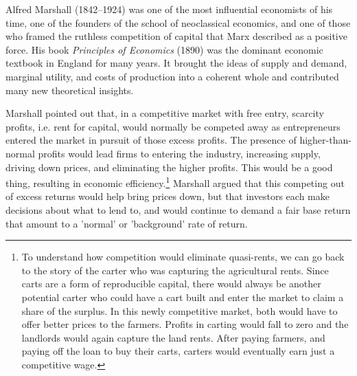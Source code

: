 Alfred Marshall (1842--1924) was one of the most influential economists of his time,  one of the founders of the school of neoclassical economics, and one of those who framed the ruthless competition of capital that Marx described as a positive force. His book \textit{Principles of Economics} (1890) \cite{marshallPrinciplesEconomics1890} was the dominant economic textbook in England for many years. It brought the ideas of supply and demand, marginal utility, and costs of production into a coherent whole and contributed many new theoretical insights.

Marshall pointed out that, in a competitive market with \gls{free entry}, {scarcity profits}, i.e. rent for capital, would normally be competed away as entrepreneurs entered the market in pursuit of those \gls{excess profits}. The presence of higher-than-normal profits would lead firms  to entering the industry, increasing supply, driving down prices, and eliminating the higher profits.  This would be a good thing, resulting in economic efficiency.\footnote{To understand how competition would eliminate quasi-rents, we can go back to the story of the carter who was capturing the agricultural rents. Since carts are a form of reproducible capital, there would always be another potential carter who could have a cart built and enter the market to claim a share of the surplus. In this newly competitive market, both would have to offer better prices to the farmers. Profits in carting would fall to zero and the landlords would again capture the land rents. After paying farmers, and paying off the loan to buy their carts, carters would eventually earn just a competitive wage.} Marshall argued that this competing out of excess returns would help bring prices down, but that investors each make decisions about what to lend to, and would continue to demand a fair base return that amount to a 'normal' or 'background' rate of return.%
